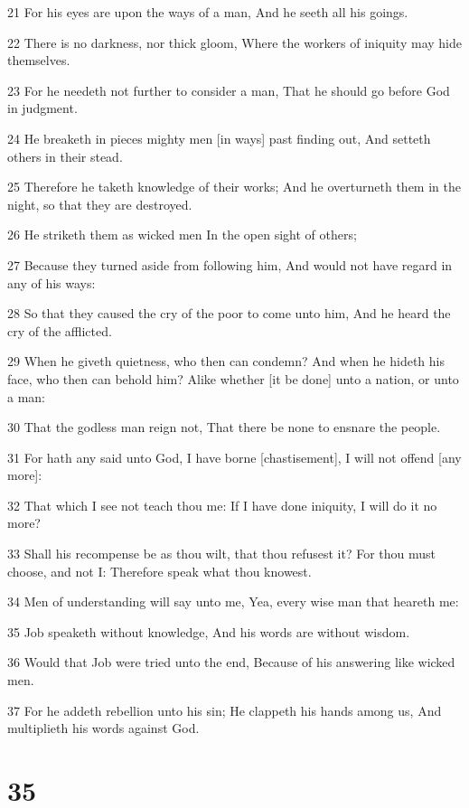 \par 21 For his eyes are upon the ways of a man, And he seeth all his goings.
\par 22 There is no darkness, nor thick gloom, Where the workers of iniquity may hide themselves.
\par 23 For he needeth not further to consider a man, That he should go before God in judgment.
\par 24 He breaketh in pieces mighty men [in ways] past finding out, And setteth others in their stead.
\par 25 Therefore he taketh knowledge of their works; And he overturneth them in the night, so that they are destroyed.
\par 26 He striketh them as wicked men In the open sight of others;
\par 27 Because they turned aside from following him, And would not have regard in any of his ways:
\par 28 So that they caused the cry of the poor to come unto him, And he heard the cry of the afflicted.
\par 29 When he giveth quietness, who then can condemn? And when he hideth his face, who then can behold him? Alike whether [it be done] unto a nation, or unto a man:
\par 30 That the godless man reign not, That there be none to ensnare the people.
\par 31 For hath any said unto God, I have borne [chastisement], I will not offend [any more]:
\par 32 That which I see not teach thou me: If I have done iniquity, I will do it no more?
\par 33 Shall his recompense be as thou wilt, that thou refusest it? For thou must choose, and not I: Therefore speak what thou knowest.
\par 34 Men of understanding will say unto me, Yea, every wise man that heareth me:
\par 35 Job speaketh without knowledge, And his words are without wisdom.
\par 36 Would that Job were tried unto the end, Because of his answering like wicked men.
\par 37 For he addeth rebellion unto his sin; He clappeth his hands among us, And multiplieth his words against God.

\chapter{35}

